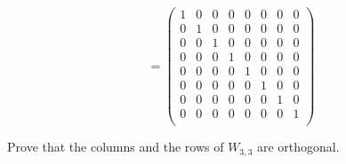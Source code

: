 \documentclass[12pt]{article}
\begin{document}
\[
=
\begin{pmatrix}
1  & 0 & 0          & 0          & 0          & 0          & 0          & 0          \\
0 & 1  & 0          & 0          & 0          & 0          & 0          & 0          \\
0          & 0          & 1  & 0  & 0          & 0          &  0          & 0          \\
0          & 0          & 0  & 1 & 0          & 0          & 0          & 0          \\
0          & 0          & 0          & 0          & 1  & 0  & 0          & 0          \\
0          & 0          & 0          & 0          & 0  & 1  & 0          & 0          \\
0          & 0          & 0          & 0          & 0          & 0          & 1  & 0  \\
0          & 0          & 0          & 0          & 0          & 0             & 0  &  1\\ 
\end{pmatrix}
\] 

Prove that the columns and the rows of $W_{3, 3}$ are orthogonal.
\end{document}
